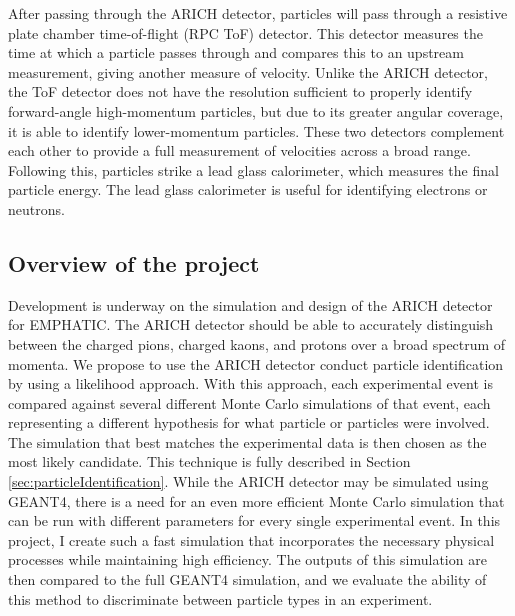 After passing through the ARICH detector, particles will pass through a resistive plate chamber time-of-flight (RPC ToF) detector.
This detector measures the time at which a particle passes through and compares this to an upstream measurement, giving another measure of velocity. 
Unlike the ARICH detector, the ToF detector does not have the resolution sufficient to properly identify forward-angle high-momentum particles, but due to its greater angular coverage, it is able to identify lower-momentum particles.
These two detectors complement each other to provide a full measurement of velocities across a broad range.
Following this, particles strike a lead glass calorimeter, which measures the final particle energy.
The lead glass calorimeter is useful for identifying electrons or neutrons.

\subsection{Overview of the project}
Development is underway on the simulation and design of the ARICH detector for EMPHATIC.
The ARICH detector should be able to accurately distinguish between the charged pions, charged kaons, and protons over a broad spectrum of momenta. 
We propose to use the ARICH detector conduct particle identification by using a likelihood approach. 
With this approach, each experimental event is compared against several different Monte Carlo simulations of that event, each representing a different hypothesis for what particle or particles were involved.
The simulation that best matches the experimental data is then chosen as the most likely candidate. This technique is fully described in Section \ref{sec:particleIdentification}. 
While the ARICH detector may be simulated using GEANT4, there is a need for an even more efficient Monte Carlo simulation that can be run with different parameters for every single experimental event.
In this project, I create such a fast simulation that incorporates the necessary physical processes while maintaining high efficiency.
The outputs of this simulation are then compared to the full GEANT4 simulation, and we evaluate the ability of this method to discriminate between particle types in an experiment.


\endinput

Any text after an \endinput is ignored.
You could put scraps here or things in progress.
